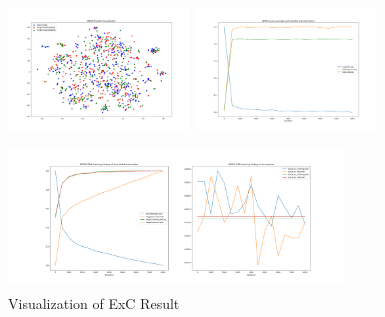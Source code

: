 \documentclass[conference]{IEEEtran}
\begin{document}
\begin{figure}[htb]
\label{fig:ExC}
\centering
\begin{minipage}[t]{0.3\textwidth}
\includegraphics[width=1.9in, height=1.5in]{Ladda/std_C2R/ADDA_visual.png}
\end{minipage}%
\begin{minipage}[t]{0.3\textwidth}
\includegraphics[width=1.9in, height=1.5in]{Ladda/std_C2R/clf.png}
\end{minipage}%
\begin{minipage}[t]{0.45\textwidth}
\includegraphics[width=3.5in, height=1.5in]{Ladda/std_C2R/gan.png}
\end{minipage}%
\caption{Visualization of ExC Result}
\end{figure}
\end{document}
